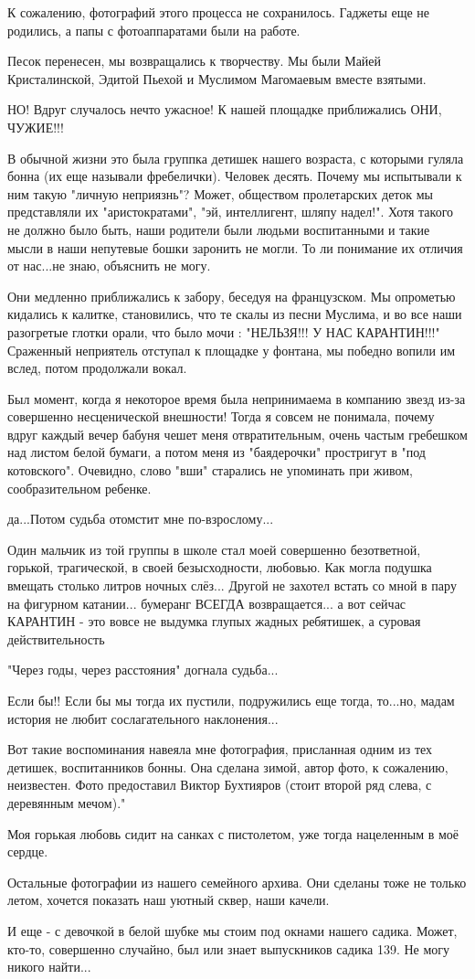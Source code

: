 К сожалению,  фотографий этого процесса не сохранилось. Гаджеты еще не
родились, а папы с фотоаппаратами были на работе.

Песок перенесен, мы возвращались к творчеству. Мы были Майей Кристалинской,
Эдитой Пьехой и Муслимом Магомаевым вместе взятыми.

НО! Вдруг случалось нечто ужасное! К нашей площадке приближались ОНИ, ЧУЖИЕ!!!

В обычной жизни это была группка детишек нашего возраста, с которыми гуляла
бонна (их еще называли фребелички). Человек десять. Почему мы испытывали к ним
такую "личную неприязнь"? Может, обществом пролетарских деток мы представляли
их "аристократами",  "эй, интеллигент, шляпу надел!". Хотя такого не должно
было быть, наши родители были людьми воспитанными и такие мысли в наши
непутевые бошки заронить не могли. То ли понимание их отличия от нас...не знаю,
объяснить не могу.

Они медленно приближались к забору, беседуя на французском. Мы опрометью
кидались к калитке, становились, что те скалы из песни Муслима, и во все наши
разогретые глотки орали, что было мочи : "НЕЛЬЗЯ!!! У НАС КАРАНТИН!!!"
Сраженный неприятель отступал к площадке у фонтана, мы победно вопили им вслед,
потом продолжали вокал.

Был момент, когда я некоторое время была непринимаема в компанию звезд из-за
совершенно несценической внешности! Тогда я совсем не понимала, почему вдруг
каждый вечер бабуня чешет меня отвратительным, очень частым гребешком над
листом белой бумаги, а потом меня из "баядерочки" простригут в "под
котовского". Очевидно, слово "вши" старались не упоминать при живом,
сообразительном ребенке.

да...Потом судьба отомстит мне по-взрослому...

Один мальчик из той группы в школе стал моей совершенно безответной, горькой,
трагической, в своей безысходности, любовью. Как могла подушка вмещать столько
литров ночных слёз... Другой не захотел встать со мной в пару на фигурном
катании... бумеранг ВСЕГДА возвращается... а вот сейчас КАРАНТИН - это вовсе не
выдумка глупых жадных ребятишек, а суровая действительность

"Через годы, через расстояния" догнала судьба...

Если бы!! Если бы мы тогда их пустили, подружились еще тогда, то...но, мадам
история не любит сослагательного наклонения...

Вот такие воспоминания навеяла мне фотография, присланная одним из тех детишек,
воспитанников бонны. Она сделана зимой, автор фото, к сожалению, неизвестен.
Фото предоставил Виктор Бухтияров (стоит второй ряд слева, с деревянным
мечом)."

Моя горькая любовь сидит на санках с пистолетом, уже тогда нацеленным в моё
сердце.

Остальные фотографии из нашего семейного архива. Они сделаны тоже не только
летом, хочется показать наш уютный сквер, наши качели.

И еще - с девочкой в белой шубке мы стоим под окнами нашего садика. Может,
кто-то, совершенно случайно, был или знает выпускников садика 139. Не могу
никого найти...

